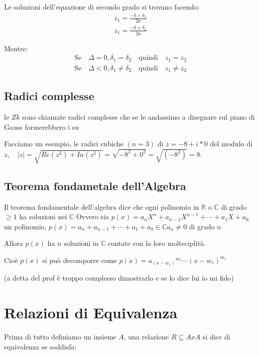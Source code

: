 \documentclass{article}
\begin{document}
Le soluzioni dell'equazione di secondo grado si trovano facendo:
\begin{align}
        z_1 = \frac{-b + \delta_1}{2a} \\
        z_1 = \frac{-b + \delta_2}{2a} 
\end{align}

Mentre:
\begin{align}
        \mbox{Se} \quad \Delta = 0, \delta_1=\delta_2 \quad \mbox{quindi} \quad z_1=z_2 \\
        \mbox{Se} \quad \Delta < 0, \delta_1 \not = \delta_2 \quad \mbox{quindi} \quad z_1 \not = z_2 
\end{align}


\subsection{Radici complesse}
le $Zk$ sono chiamate radici complesse che se le andassimo a disegnare sul piano di Gauss formerebbero i su \newline

Facciamo un esempio, le radici cubiche $(n=3)$ di $z = -8 +i*0$ del modulo di $z, \quad|z| = \sqrt{Re(z^2)+In(z^2)} = \sqrt{-8^2 + 0^2} = \sqrt{(-8^2)} = 8$.


\subsection{Teorema fondametale dell'Algebra}
Il teorema fondamentale dell'algebra dice che ogni polinomio in $\mathbb{R}$ o $\mathbb{C}$ di grado $\geq 1$ ha soluzioni nei $\mathbb{C}$ \newline 
Ovvero sia $p(x) = a_n X^n + a_{n-1} X^{n-1} + \cdots + a_1 X + a_0$ un polinomio, $p(x) = a_n  + a_{n-1} + \cdots + a_1 + a_0 \in \mathbb{C} a_n \not = 0$ di grado $n$ \par
Allora $p(x)$ ha $n$ soluzioni in $\mathbb{C}$ contate con la loro molteciplità.\par
Cioè $p(x)$ si può decomporre come $p(x) = {a_(x-w_1)}^{m_1} \cdots {(x-w_r)}^{m_r}$ \newline

(a detta del prof è troppo complesso dimostrarlo e se lo dice lui io mi fido)





\newpage
\section{Relazioni di Equivalenza}
Prima di tutto definiamo un insieme $A$, una relazione $R \subseteq AxA$ si dice di equivalenza se soddisfa:
\end{document}
